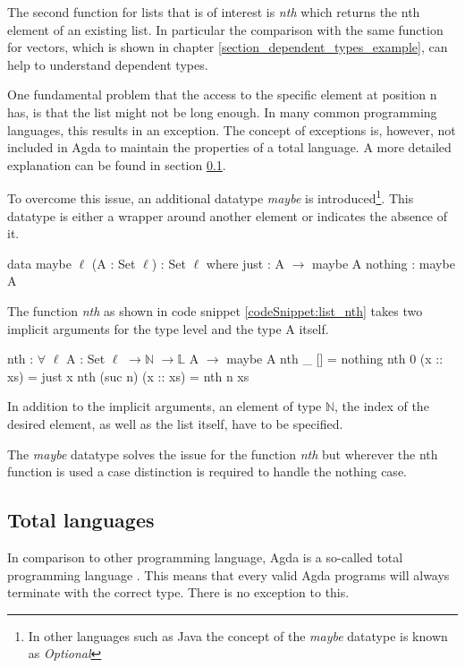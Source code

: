 The second function for lists that is of interest is \emph{nth} which returns the nth element of an existing list.
In particular the comparison with the same function for vectors, which is shown in chapter \ref{section_dependent_types_example}, can help to understand dependent types.

One fundamental problem that the access to the specific element at position n has, is that the list might not be long enough.
In many common programming languages, this results in an exception. The concept of exceptions is, however, not included in Agda to maintain the properties of a total language.
A more detailed explanation can be found in section \ref{section:total_languages}.

To overcome this issue, an additional datatype \emph{maybe} is introduced\footnote{In other languages such as Java the concept of the \emph{maybe} datatype is known as \emph{Optional}}.
This datatype is either a wrapper around another element or indicates the absence of it.

\begin{codesnippet}[mathescape=true, caption={Definition of the maybe datatype in Agda}, label={codeSnippet:maybe_datatype}]
data maybe {$\ell$} (A : Set $\ell$) : Set $\ell$ where
  just : A $\rightarrow$ maybe A
  nothing : maybe A
\end{codesnippet}

The function \emph{nth} as shown in code snippet \ref{codeSnippet:list_nth} takes two implicit arguments for the type level and the type A itself.

\begin{codesnippet}[mathescape=true, caption={Definition of nth function in Agda}, label={codeSnippet:list_nth}]
nth : $\forall$ {$\ell$} {A : Set $\ell$} $\rightarrow \mathbb{N}$ $\rightarrow \mathbb{L}$ A $\rightarrow$ maybe A
nth _ [] = nothing
nth 0 (x :: xs) = just x
nth (suc n) (x :: xs) = nth n xs
\end{codesnippet}

In addition to the implicit arguments, an element of type $\mathbb{N}$, the index of the desired element, as well as the list itself, have to be specified.

The \emph{maybe} datatype solves the issue for the function \emph{nth} but wherever the nth function is used a case distinction is required to handle the nothing case.

\subsection{Total languages}\label{section:total_languages}
In comparison to other programming language, Agda is a so-called total programming language \cite{AgdaReadTheDocs}.
This means that every valid Agda programs will always terminate with the correct type. There is no exception to this.

